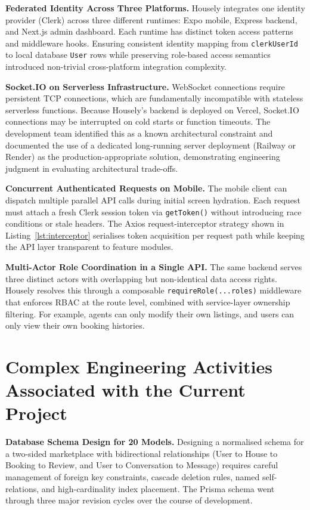 \documentclass[12pt,a4paper]{report}
\begin{document}
\textbf{Federated Identity Across Three Platforms.}
Housely integrates one identity provider (Clerk) across three different runtimes: Expo
mobile, Express backend, and Next.js admin dashboard. Each runtime has distinct token
access patterns and middleware hooks. Ensuring consistent identity mapping from
\texttt{clerkUserId} to local database \texttt{User} rows while preserving role-based access
semantics introduced non-trivial cross-platform integration complexity.

\textbf{Socket.IO on Serverless Infrastructure.}
WebSocket connections require persistent TCP connections, which are fundamentally
incompatible with stateless serverless functions. Because Housely's backend is deployed
on Vercel, Socket.IO connections may be interrupted on cold starts or function timeouts.
The development team identified this as a known architectural constraint and documented
the use of a dedicated long-running server deployment (Railway or Render) as the
production-appropriate solution, demonstrating engineering judgment in evaluating
architectural trade-offs.

\textbf{Concurrent Authenticated Requests on Mobile.}
The mobile client can dispatch multiple parallel API calls during initial screen hydration.
Each request must attach a fresh Clerk session token via \texttt{getToken()} without
introducing race conditions or stale headers. The Axios request-interceptor strategy shown
in Listing~\ref{lst:interceptor} serialises token acquisition per request path while keeping
the API layer transparent to feature modules.

\textbf{Multi-Actor Role Coordination in a Single API.}
The same backend serves three distinct actors with overlapping but non-identical data
access rights. Housely resolves this through a composable \texttt{requireRole(...roles)}
middleware that enforces RBAC at the route level, combined with service-layer ownership
filtering. For example, agents can only modify their own listings, and users can only
view their own booking histories.

\section{Complex Engineering Activities Associated with the Current Project}

\textbf{Database Schema Design for 20 Models.}
Designing a normalised schema for a two-sided marketplace with bidirectional relationships
(User to House to Booking to Review, and User to Conversation to Message) requires careful
management of foreign key constraints, cascade deletion rules, named self-relations, and
high-cardinality index placement. The Prisma schema went through three major revision
cycles over the course of development.
\end{document}
